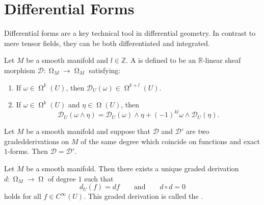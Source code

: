 \section*{Differential Forms}
Differential forms are a key technical tool in differential geometry. In contrast to mere tensor fields, they can be both differentiated and integrated.

\begin{definition}
	Let $M$ be a smooth manifold and $l \in \mathbb{Z}$. A  is defined to be an $\mathbb{R}$-linear sheaf morphism $\mathcal{D} : \upOmega_M \to \upOmega_M$ satisfying:
	\begin{enumerate}[label=\textup{(\roman*)},leftmargin=*]
		\item If $\omega \in \upOmega^k(U)$, then $\mathcal{D}_U(\omega) \in \upOmega^{k + l}(U)$.
		\item If $\omega \in \upOmega^k(U)$ and $\eta \in \upOmega(U)$, then
			\begin{equation*}
				\mathcal{D}_U(\omega \wedge \eta) = \mathcal{D}_U(\omega) \wedge \eta + (-1)^{kl}\omega \wedge \mathcal{D}_U(\eta).
			\end{equation*}
	\end{enumerate}
\end{definition}

\begin{proposition}
	Let $M$ be a smooth manifold and suppose that $\mathcal{D}$ and $\mathcal{D}'$ are two gradedderivations on $M$ of the same degree which coincide on functions and exact $1$-forms. Then $\mathcal{D} = \mathcal{D}'$.
\end{proposition}

\begin{theorem}
	Let $M$ be a smooth manifold. Then there exists a unique graded derivation $d : \upOmega_M \to \upOmega$ of degree $1$ such that
	\begin{equation*}
		d_U(f) = df \qquad \text{and} \qquad d \circ d = 0
	\end{equation*}
	\noindent holds for all $f \in C^\infty(U)$. This graded derivation is called the .
\end{theorem}
